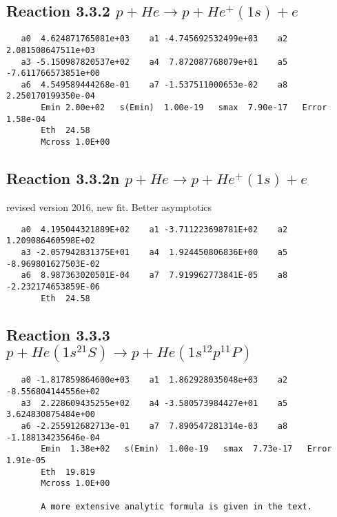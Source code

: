 \documentclass[12pt,dvipdfmx]{article}
\begin{document}
\newpage
\subsection{
Reaction 3.3.2 $    p + He \rightarrow p + He^+(1s) + e$}


\begin{small}\begin{verbatim}
   a0  4.624871765081e+03    a1 -4.745692532499e+03    a2  2.081508647511e+03
   a3 -5.150987820537e+02    a4  7.872087768079e+01    a5 -7.611766573851e+00
   a6  4.549589444268e-01    a7 -1.537511000653e-02    a8  2.250170199350e-04
       Emin 2.00e+02   s(Emin)  1.00e-19   smax  7.90e-17   Error 1.58e-04
       Eth  24.58
       Mcross 1.0E+00
\end{verbatim}\end{small}


\subsection{
Reaction 3.3.2n $    p + He \rightarrow p + He^+(1s) + e$}
revised version 2016, new fit. Better asymptotics

\begin{small}\begin{verbatim}
   a0  4.195044321889E+02    a1 -3.711223698781E+02    a2  1.209086460598E+02
   a3 -2.057942831375E+01    a4  1.924450806836E+00    a5 -8.969801627503E-02
   a6  8.987363020501E-04    a7  7.919962773841E-05    a8 -2.232174653859E-06
       Eth  24.58

\end{verbatim}\end{small}


\newpage
\subsection{
Reaction 3.3.3 $p + He(1s^21S) \rightarrow p + He(1s^12p^11P)$}















\begin{small}\begin{verbatim}
   a0 -1.817859864600e+03    a1  1.862928035048e+03    a2 -8.556804144556e+02
   a3  2.228609435255e+02    a4 -3.580573984427e+01    a5  3.624830875484e+00
   a6 -2.255912682713e-01    a7  7.890547281314e-03    a8 -1.188134235646e-04
       Emin  1.38e+02   s(Emin)  1.00e-19   smax  7.73e-17   Error  1.91e-05
       Eth  19.819
       Mcross 1.0E+00

       A more extensive analytic formula is given in the text.
\end{verbatim}\end{small}
\end{document}

